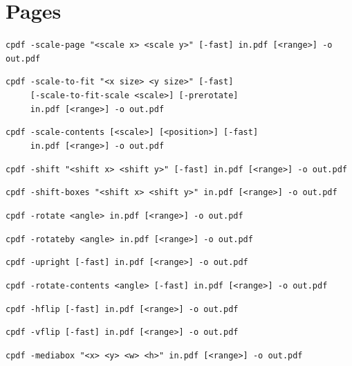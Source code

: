 \documentclass{book}
\begin{document}
\chapter{Pages}\label{chap:3}
\pagestyle{fancy}
  \label{pages}
  \begin{framed}
  \small\noindent\verb!cpdf -scale-page "<scale x> <scale y>" [-fast] in.pdf [<range>] -o out.pdf!
   
  \vspace{1.5mm}
  \small\noindent\verb!cpdf -scale-to-fit "<x size> <y size>" [-fast]!\\
        \noindent\verb!     [-scale-to-fit-scale <scale>] [-prerotate]!\\    
        \noindent\verb!     in.pdf [<range>] -o out.pdf!

  \vspace{1.5mm}
  \small\noindent\verb!cpdf -scale-contents [<scale>] [<position>] [-fast]!\\
        \noindent\verb!     in.pdf [<range>] -o out.pdf!
  
  \vspace{1.5mm}
  \small\noindent\verb!cpdf -shift "<shift x> <shift y>" [-fast] in.pdf [<range>] -o out.pdf!

  \vspace{1.5mm}
  \small\noindent\verb!cpdf -shift-boxes "<shift x> <shift y>" in.pdf [<range>] -o out.pdf!

  \vspace{1.5mm}
  \small\noindent\verb!cpdf -rotate <angle> in.pdf [<range>] -o out.pdf!

  \vspace{1.5mm}
  \small\noindent\verb!cpdf -rotateby <angle> in.pdf [<range>] -o out.pdf!

  \vspace{1.5mm}
  \small\noindent\verb!cpdf -upright [-fast] in.pdf [<range>] -o out.pdf!

  \vspace{1.5mm}
  \small\noindent\verb!cpdf -rotate-contents <angle> [-fast] in.pdf [<range>] -o out.pdf!


  \vspace{1.5mm}
  \small\noindent\verb!cpdf -hflip [-fast] in.pdf [<range>] -o out.pdf!

  \vspace{1.5mm}
  \small\noindent\verb!cpdf -vflip [-fast] in.pdf [<range>] -o out.pdf!
  
  \vspace{1.5mm}
  \small\noindent\verb!cpdf -mediabox "<x> <y> <w> <h>" in.pdf [<range>] -o out.pdf!



\end{framed}
\end{document}
